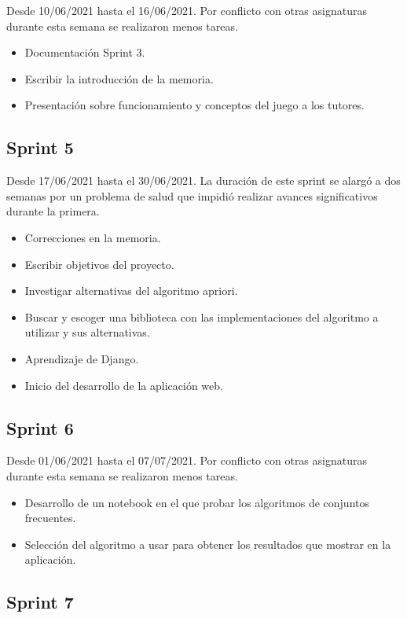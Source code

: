 Desde 10/06/2021 hasta el 16/06/2021. Por conflicto con otras asignaturas durante esta semana se realizaron menos tareas.

\begin{itemize}
    \item Documentación Sprint 3.
    \item Escribir la introducción de la memoria.
    \item Presentación sobre funcionamiento y conceptos del juego a los tutores.
\end{itemize}

\subsection{Sprint 5}

Desde 17/06/2021 hasta el 30/06/2021. La duración de este sprint se alargó a dos semanas por un problema de salud que impidió realizar avances significativos durante la primera.

\begin{itemize}
    \item Correcciones en la memoria.
    \item Escribir objetivos del proyecto.
    \item Investigar alternativas del algoritmo apriori.
    \item Buscar y escoger una biblioteca con las implementaciones del algoritmo a utilizar y sus alternativas.
    \item Aprendizaje de Django.
    \item Inicio del desarrollo de la aplicación web.
\end{itemize}

\subsection{Sprint 6}

Desde 01/06/2021 hasta el 07/07/2021. Por conflicto con otras asignaturas durante esta semana se realizaron menos tareas.

\begin{itemize}
    \item Desarrollo de un notebook en el que probar los algoritmos de conjuntos frecuentes.
    \item Selección del algoritmo a usar para obtener los resultados que mostrar en la aplicación.
\end{itemize}

\subsection{Sprint 7}

